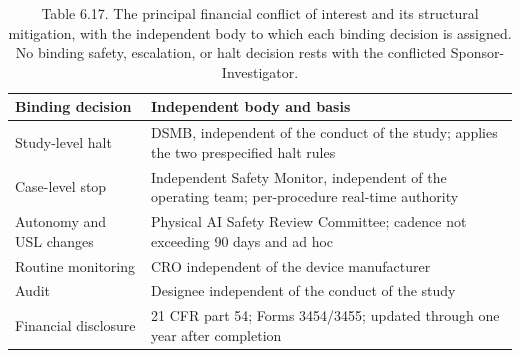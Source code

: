 \begin{table}[t]
\caption{Table 6.17. The principal financial conflict of interest and its structural
mitigation, with the independent body to which each binding decision is assigned. No
binding safety, escalation, or halt decision rests with the conflicted
Sponsor-Investigator.}
\label{tab:sec06-coi}
\centering
\begin{tabularx}{\textwidth}{L{3.8cm} Y}
\toprule
\textbf{Binding decision} & \textbf{Independent body and basis} \\
\midrule
Study-level halt & DSMB, independent of the conduct of the study; applies the two prespecified halt rules \\
Case-level stop & Independent Safety Monitor, independent of the operating team; per-procedure real-time authority \\
Autonomy and USL changes & Physical AI Safety Review Committee; cadence not exceeding 90 days and ad hoc \\
Routine monitoring & CRO independent of the device manufacturer \\
Audit & Designee independent of the conduct of the study \\
Financial disclosure & 21 CFR part 54; Forms 3454/3455; updated through one year after completion \\
\bottomrule
\end{tabularx}
\end{table}
